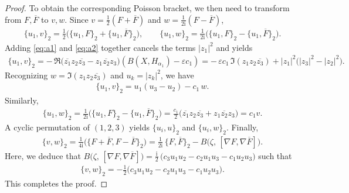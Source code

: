 \documentclass[11pt]{amsart}
\theoremstyle{definition}
\theoremstyle{plain}
\theoremstyle{conclusion}
\begin{document}
\begin{proof}
To obtain the corresponding Poisson bracket, we then need to transform from $F,\overline{F}$ to $v,w$.  Since $v=\frac{1}{2}(F+\overline{F})$ and $w=\frac{1}{2\mathrm{i}}(F-\overline{F})$, \begin{align*}
\{u_1,v\}_2 =\frac{1}{2}\big(\{u_1,F\}_2+\{u_1,\overline{F}\}_2\big),\qquad \{u_1,w\}_2 =\frac{1}{2\mathrm{i}}\big(\{u_1,F\}_2-\{u_1,\overline{F}\}_2\big).
\end{align*} Adding \eqref{eq:a1} and \eqref{eq:a2} together cancels the terms $|z_1|^2$ and yields \begin{align*}
\{u_1,v\}_2 = -\,\Re\Big(\overline{z_1}z_2\overline{z_3}-z_1\overline{z_2}z_3\Big)\left(B(X,H_{\alpha_1})-\varepsilon c_1\right) = -\,\varepsilon c_1\,\Im(z_1z_2\overline{z_3}) +|z_1|^2\big(|z_3|^2-|z_2|^2\big).
\end{align*} Recognizing $w=\Im(z_1z_2\overline{z_3})$ and $u_k=|z_k|^2$, we have \begin{align}
 \{u_1,v\}_2=u_1(u_3-u_2)-c_1\,w . \label{eq:b}
\end{align} Similarly, \begin{align}
\{u_1,w\}_2 =\frac{1}{2\mathrm{i}}\big(\{u_1,F\}_2-\{u_1,\overline{F}\}_2\big) =  \frac{c_1}{2}\big(\overline{z_1}z_2\overline{z_3}+z_1\overline{z_2}z_3\big) =  c_1 v . \label{eq:c}
\end{align} A cyclic permutation of $(1,2,3)$ yields $\{u_i,u\}_2$ and $\{u_i,w\}_2 $. Finally, \begin{align*}
\{v,w\}_2 =\frac{1}{4\mathrm{i}}\big(\{F+\overline{F},F-\overline{F}\}_2\big) =\frac{1}{2\mathrm{i}}\,\{F,\overline{F}\}_2- B \big(\zeta,\,[\nabla F,\nabla\overline{F}]\big).
\end{align*} Here, we deduce that $B\big(\zeta,\,[\nabla F,\nabla\overline{F}]\big) = \frac{\mathrm{i}}{2}\,\Big(c_3 u_1u_2-c_2 u_1u_3-c_1 u_2u_3\Big) $ such that \begin{align}
 \{v,w\}_2=-\frac{1}{2}\Big(c_3 u_1u_2-c_2 u_1u_3-c_1 u_2u_3\Big).
\end{align} This completes the proof.
\end{proof}
\end{document}
